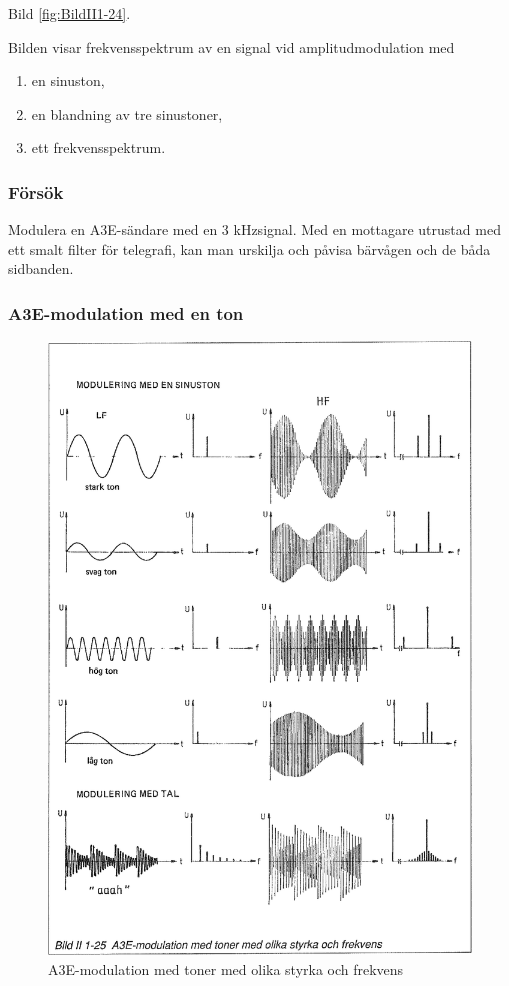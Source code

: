 Bild \ref{fig:BildII1-24}.

Bilden visar frekvensspektrum av en signal vid amplitudmodulation med

\begin{enumerate}[label=\alph*.,noitemsep]
\item en sinuston,
\item en blandning av tre sinustoner,
\item ett frekvensspektrum.
\end{enumerate}

\subsubsection{Försök}

Modulera en A3E-sändare med en 3 kHzsignal. Med en mottagare utrustad med ett
smalt filter för telegrafi, kan man urskilja och påvisa bärvågen och de båda
sidbanden.

\subsubsection{A3E-modulation med en ton}

\begin{figure}[ht]
\begin{center}
\includegraphics[width=14cm]{images/bild_2_1-25}
\caption{A3E-modulation med toner med olika styrka och frekvens}
\label{fig:BildII1-25}
\end{center}
\end{figure}


